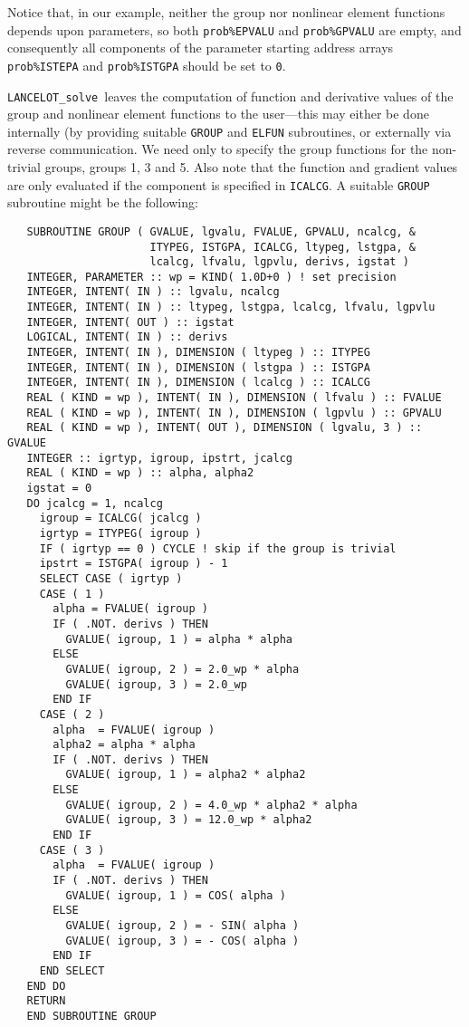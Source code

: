 \documentclass{galahad}
\newcommand{\fullpackagename}{LANC\-E\-LOT}
\newcommand{\solver}{{\tt \fullpackagename\_solve}}
\begin{document}
Notice that, in our example, neither the group nor nonlinear element functions
depends upon parameters, so both {\tt prob\%EPVALU} and {\tt prob\%GPVALU} are
empty, and consequently all components of the parameter starting address arrays
{\tt prob\%ISTEPA} and {\tt prob\%ISTGPA} should be set to {\tt 0}.

\solver\ leaves the computation of function and derivative values of the
group and nonlinear element functions to the user---this may either be
done internally (by providing suitable {\tt GROUP} and {\tt ELFUN}
subroutines, or externally via reverse communication.  We need only to
specify the group functions for the non-trivial groups, groups 1, 3 and
5.  Also note that the function and gradient values are only evaluated
if the component is specified in {\tt ICALCG}.  A suitable {\tt GROUP}
subroutine might be the following:

\def\baselinestretch{0.8}
{%
{\tt \begin{verbatim}
   SUBROUTINE GROUP ( GVALUE, lgvalu, FVALUE, GPVALU, ncalcg, &
                      ITYPEG, ISTGPA, ICALCG, ltypeg, lstgpa, &
                      lcalcg, lfvalu, lgpvlu, derivs, igstat )
   INTEGER, PARAMETER :: wp = KIND( 1.0D+0 ) ! set precision
   INTEGER, INTENT( IN ) :: lgvalu, ncalcg
   INTEGER, INTENT( IN ) :: ltypeg, lstgpa, lcalcg, lfvalu, lgpvlu
   INTEGER, INTENT( OUT ) :: igstat
   LOGICAL, INTENT( IN ) :: derivs
   INTEGER, INTENT( IN ), DIMENSION ( ltypeg ) :: ITYPEG
   INTEGER, INTENT( IN ), DIMENSION ( lstgpa ) :: ISTGPA
   INTEGER, INTENT( IN ), DIMENSION ( lcalcg ) :: ICALCG
   REAL ( KIND = wp ), INTENT( IN ), DIMENSION ( lfvalu ) :: FVALUE
   REAL ( KIND = wp ), INTENT( IN ), DIMENSION ( lgpvlu ) :: GPVALU
   REAL ( KIND = wp ), INTENT( OUT ), DIMENSION ( lgvalu, 3 ) :: GVALUE
   INTEGER :: igrtyp, igroup, ipstrt, jcalcg
   REAL ( KIND = wp ) :: alpha, alpha2
   igstat = 0
   DO jcalcg = 1, ncalcg
     igroup = ICALCG( jcalcg )
     igrtyp = ITYPEG( igroup )
     IF ( igrtyp == 0 ) CYCLE ! skip if the group is trivial
     ipstrt = ISTGPA( igroup ) - 1
     SELECT CASE ( igrtyp )
     CASE ( 1 )
       alpha = FVALUE( igroup )
       IF ( .NOT. derivs ) THEN
         GVALUE( igroup, 1 ) = alpha * alpha
       ELSE
         GVALUE( igroup, 2 ) = 2.0_wp * alpha
         GVALUE( igroup, 3 ) = 2.0_wp
       END IF
     CASE ( 2 )
       alpha  = FVALUE( igroup )
       alpha2 = alpha * alpha
       IF ( .NOT. derivs ) THEN
         GVALUE( igroup, 1 ) = alpha2 * alpha2
       ELSE
         GVALUE( igroup, 2 ) = 4.0_wp * alpha2 * alpha
         GVALUE( igroup, 3 ) = 12.0_wp * alpha2
       END IF
     CASE ( 3 )
       alpha  = FVALUE( igroup )
       IF ( .NOT. derivs ) THEN
         GVALUE( igroup, 1 ) = COS( alpha )
       ELSE
         GVALUE( igroup, 2 ) = - SIN( alpha )
         GVALUE( igroup, 3 ) = - COS( alpha )
       END IF
     END SELECT
   END DO
   RETURN
   END SUBROUTINE GROUP
\end{verbatim} } }
\def\baselinestretch{1.0}
\end{document}
